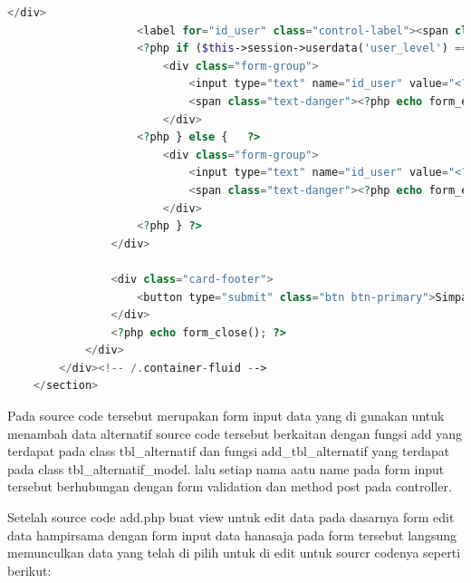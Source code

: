 \begin{lstlisting}[language=PHP]
	                </div>  
	                <label for="id_user" class="control-label"><span class="text-danger">*</span>Id User</label>  
	                <?php if ($this->session->userdata('user_level') === 'admin') {    ?>  
	                    <div class="form-group">  
	                        <input type="text" name="id_user" value="<?php echo $this->session->userdata('user_id') ?>" class="form-control" id="id_user" />  
	                        <span class="text-danger"><?php echo form_error('id_user'); ?></span>  
	                    </div>  
	                <?php } else {   ?>  
	                    <div class="form-group">  
	                        <input type="text" name="id_user" value="<?php echo $this->session->userdata('user_id') ?>" class="form-control" id="id_user" readonly />  
	                        <span class="text-danger"><?php echo form_error('id_user'); ?></span>  
	                    </div>  
	                <?php } ?>  
	            </div>  
	  
	            <div class="card-footer">  
	                <button type="submit" class="btn btn-primary">Simpan Data</button>  
	            </div>  
	            <?php echo form_close(); ?> 
	        </div>  
	    </div><!-- /.container-fluid -->  
	</section>  
\end{lstlisting}
Pada source code tersebut merupakan form input data yang di gunakan untuk menambah data alternatif source code tersebut berkaitan dengan fungsi add yang terdapat pada class tbl\_alternatif dan fungsi add\_tbl\_alternatif yang terdapat pada class tbl\_alternatif\_model. lalu setiap nama aatu name pada form input tersebut berhubungan dengan form validation dan method post pada controller.\par
	Setelah source code add.php buat view untuk edit data pada dasarnya form edit data hampirsama dengan form input data hanasaja pada form tersebut langsung memunculkan data yang telah di pilih untuk di edit untuk sourcr codenya seperti berikut:\par

